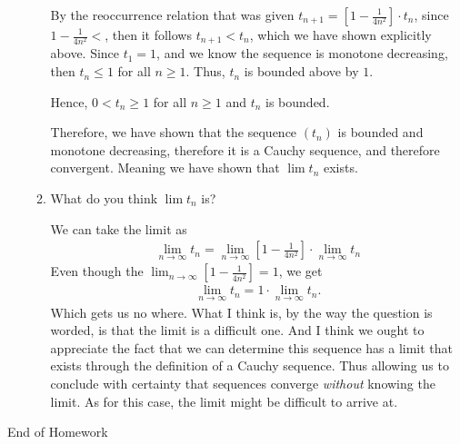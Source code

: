 \documentclass [10pt]{article}
\newcommand{\jg}[1]{{\color{blue} #1}}
\begin{document}
\begin{enumerate}
\begin{enumerate}
{By the reoccurrence relation that was given $t_{n+1} = [1-\frac{1}{4n^2}] \cdot t_n$, since $1 - \frac{1}{4n^2} < $, then it follows $t_{n+1} < t_n$, which we have shown explicitly above. Since $t_1 = 1$, and we know the sequence is monotone decreasing, then $t_n \leq 1$ for all $n \geq 1$. Thus, $t_n$ is bounded above by $1$. 

Hence, $0 < t_n \geq 1$ for all $n \geq 1$ and $t_n$ is bounded. 

Therefore, we have shown that the sequence $(t_n)$ is bounded and monotone decreasing, therefore it is a Cauchy sequence, and therefore convergent. Meaning we have shown that $\lim t_n$ exists. 
}

\item What do you think $\lim t_n$ is?

\jg{
We can take the limit as
\begin{align*}
    \lim_{n \rightarrow \infty} t_n = \lim_{n \rightarrow \infty} \left[ 1-\frac{1}{4n^2}\right] \cdot \lim_{n \rightarrow \infty} t_n
\end{align*}
Even though the $\lim_{n \rightarrow \infty} \left[ 1-\frac{1}{4n^2}\right] = 1$, we get
\begin{align*}
    \lim_{n \rightarrow \infty} t_n = 1 \cdot \lim_{n \rightarrow \infty} t_n.
\end{align*}
Which gets us no where. What I think is, by the way the question is worded, is that the limit is a difficult one. And I think we ought to appreciate the fact that we can determine this sequence has a limit that exists through the definition of a Cauchy sequence. Thus allowing us to conclude with certainty that sequences converge \emph{without} knowing the limit. As for this case, the limit might be difficult to arrive at. 
}
\end{enumerate}
\end{enumerate}

\clearpage
\begin{center}
\vspace*{\fill}
{\Large End of Homework}
\vspace*{\fill}
\end{center}
\end{document}
